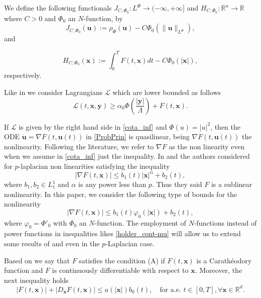 \documentclass[twoside]{article}
\theoremstyle{remark}
\newcommand{\orlnor}{\|_{L^{\Phi}}}
\newcommand{\lphi}{L^{\Phi}}
\renewcommand{\b}[1]{\boldsymbol{#1}}
\newcommand{\rr}{\mathbb{R}}
\renewcommand{\leq}{\leqslant}
\renewcommand{\geq}{\geqslant}
\begin{document}
We define the following  functionals $J_{C,\Phi_0}:\lphi\to (-\infty,+\infty]$ and $  H_{C,\Phi_0}:\rr^n\to \rr$ where $C>0$ and $\Phi_0$ an $N$-function, by
\begin{equation}\label{func_phi}
  J_{C,\Phi_0}(\b{u}):= \rho_{\Phi}\left(\b{u}\right)-C\Phi_0\left(\|\b{u}\orlnor\right),
\end{equation}
 and

\begin{equation}\label{eq:functional_H-bis}
 H_{C,\Phi_0}(\b{x}):=\int_0^TF(t,\b{x})dt-C\Phi_0(|\b{x}|),
\end{equation}
respectively.











Like in \cite{ABGMS2015} we consider Lagrangians $\mathcal{L}$ which are lower bounded as follows 
\begin{equation}\label{cota_inf}
\mathcal{L}(t,\b{x},\b{y})\geq \alpha_0\Phi\left(\frac{|\b{y}|}{\Lambda}\right)+ F(t,\b{x}).
\end{equation}

If $\mathcal{L}$ is given by the right hand side in \eqref{cota_inf} and $\Phi(u)=|u|^2$, then the ODE $\ddot{\b{u}}=\nabla F(t,\b{u}(t))$ in \eqref{ProbPrin}  is quasilinear,  being  $\nabla F(t,\b{u}(t))$ the nonlinearity. Following the literature, we refer to $\nabla F$ as the non linearity even when we assume in \eqref{cota_inf} just the inequality. In \cite{tang1998periodic} and \cite{tang2010periodic} the authors considered for $p$-laplacian non linearities satisfying the inequality
\[ |\nabla F(t,\b{x})|\leq b_1(t)|\b{x}|^{\alpha}+b_2(t),\]
where  $b_1,b_2 \in L^1_1$ and $\alpha$ is any power less than $p$. Thus they said $F$ is a sublinear nonlinearity. In this paper, we consider the following type of bounds for the nonlinearity 
\begin{equation}\label{holder_cont-mu}
  \left| \nabla F(t,\b{x}) \right|\leq b_1(t)\varphi_0(|\b{x}|)+b_2(t),
\end{equation}
where $\varphi_0=\Phi'_0$ with $\Phi_0$ an $N$-function. The employment of  $N$-functions instead of power functions in  inequalities likes  \eqref{holder_cont-mu}  will allow us to extend some results of   \cite{tang1998periodic} and \cite{tang2010periodic} even in the $p$-Laplacian case.


Based on \cite{mawhin2010critical} we say that $F$ satisfies the condition (A) if  $F(t,\b{x})$ is a Carath\'eo\-dory function and  $F$ is continuously differentiable with respect to $\b{x}$. Moreover, the next inequality holds 
\begin{equation}\label{condA2}|F(t,\b{x})|+ |D_{\b{x}}F(t,\b{x})|\leq a(|\b{x}|)b_0(t),\quad\text{for a.e. }t\in [0,T], \forall\b{x}\in\rr^d.
\end{equation}
\end{document}
